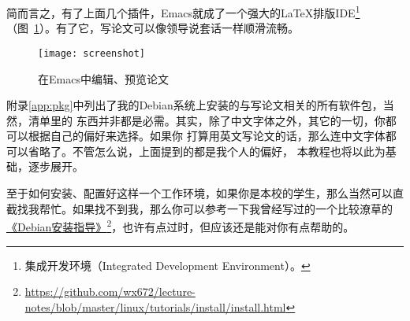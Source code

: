 \begin{description}
  简而言之，有了上面几个插件，Emacs就成了一个强大的\LaTeX{}排版IDE\footnote{集成开发环境（Integrated
    Development Environment）。}（图~\ref{fig:screenshot}）。有了它，写论文可以像领导说套话一样顺滑流畅。
\end{description}

\begin{figure}[ht]
  \centering
  \begin{center}
    \texttt{[image: screenshot]}
  \end{center}
  \caption{在Emacs中编辑、预览论文\label{fig:screenshot}}  
\end{figure}

附录\ref{app:pkg}中列出了我的Debian系统上安装的与写论文相关的所有软件包，当然，清单里的
东西并非都是必需。其实，除了中文字体之外，其它的一切，你都可以根据自己的偏好来选择。如果你
打算用英文写论文的话，那么连中文字体都可以省略了。不管怎么说，上面提到的都是我个人的偏好，
本教程也将以此为基础，逐步展开。

至于如何安装、配置好这样一个工作环境，如果你是本校的学生，那么当然可以直截找我帮忙。如果找不到我，那么你可以参考一下我曾经写过的一个比较潦草的%
\href{https://github.com/wx672/lecture-notes/blob/master/linux/tutorials/install/install.html}{《Debian安装指导》}\footnote{%
  \url{https://github.com/wx672/lecture-notes/blob/master/linux/tutorials/install/install.html}}，也许有点过时，但应该还是能对你有点帮助的。

